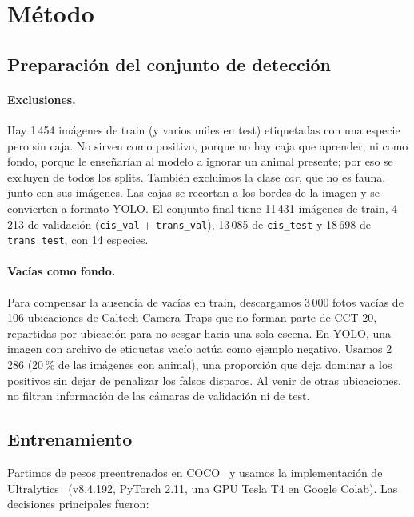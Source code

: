 \documentclass{article}
\begin{document}
\section{Método}
\label{sec:metodo}

\subsection{Preparación del conjunto de detección}

\paragraph{Exclusiones.} Hay 1\,454 imágenes de train (y varios miles en test)
etiquetadas con una especie pero sin caja. No sirven como positivo, porque no
hay caja que aprender, ni como fondo, porque le enseñarían al modelo a ignorar
un animal presente; por eso se excluyen de todos los splits. También excluimos
la clase \emph{car}, que no es fauna, junto con sus imágenes. Las cajas se
recortan a los bordes de la imagen y se convierten a formato YOLO. El conjunto
final tiene 11\,431 imágenes de train, 4\,213 de validación (\texttt{cis\_val}
+ \texttt{trans\_val}), 13\,085 de \texttt{cis\_test} y 18\,698 de
\texttt{trans\_test}, con 14 especies.

\paragraph{Vacías como fondo.} Para compensar la ausencia de vacías en train,
descargamos 3\,000 fotos vacías de 106 ubicaciones de Caltech Camera Traps que
no forman parte de CCT-20, repartidas por ubicación para no sesgar hacia una
sola escena. En YOLO, una imagen con archivo de etiquetas vacío actúa como
ejemplo negativo. Usamos 2\,286 (20\,\% de las imágenes con animal), una
proporción que deja dominar a los positivos sin dejar de penalizar los falsos
disparos. Al venir de otras ubicaciones, no filtran información de las
cámaras de validación ni de test.

\subsection{Entrenamiento}

Partimos de pesos preentrenados en COCO~\cite{lin2014coco} y usamos la
implementación de Ultralytics~\cite{jocher2023yolov8} (v8.4.192, PyTorch 2.11,
una GPU Tesla T4 en Google Colab). Las decisiones principales fueron:
\end{document}
